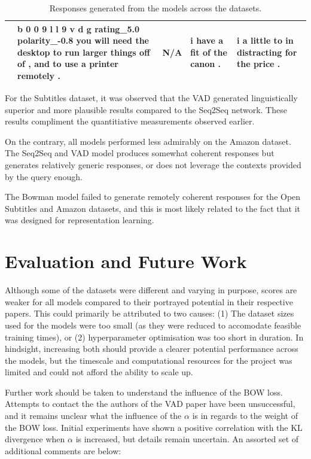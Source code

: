 \documentclass[12pt,twoside]{report}
\begin{document}
\begin{table}[!ht]
\begin{tabular}{|p{1.5cm}|p{2.8cm}|p{2.8cm}|p{2.8cm}|p{2.8cm}|}
													 & b 0 0 9 l l 9 v d g rating\_5.0 polarity\_-0.8 you will need the desktop to run larger things off of , and to use a printer remotely . & N/A                                                       & i have a fit of the canon .                                        & i a little to in distracting for the price .                               \\ \hline
	\end{tabular}
	\caption{Responses generated from the models across the datasets.}
	\label{qualitative_table}
\end{table}

For the Subtitles dataset, it was observed that the VAD generated linguistically superior and more plausible results compared to the Seq2Seq network. These results compliment the quantitiative measurements observed earlier.

On the contrary, all models performed less admirably on the Amazon dataset. The Seq2Seq and VAD model produces somewhat coherent responses but generates relatively generic responses, or does not leverage the contexts provided by the query enough.

The Bowman model failed to generate remotely coherent responses for the Open Subtitles and Amazon datasets, and this is most likely related to the fact that it was designed for representation learning.

\chapter{Evaluation and Future Work}

Although some of the datasets were different and varying in purpose, scores are weaker for all models compared to their portrayed potential in their respective papers. This could primarily be attributed to two causes: (1) The dataset sizes used for the models were too small (as they were reduced to accomodate feasible training times), or (2) hyperparameter optimisation was too short in duration. In hindsight, increasing both should provide a clearer potential performance across the models, but the timescale and computational resources for the project was limited and could not afford the ability to scale up.

Further work should be taken to understand the influence of the BOW loss. Attempts to contact the the authors of the VAD paper have been unsuccessful, and it remains unclear what the influence of the $\alpha$ is in regards to the weight of the BOW loss. Initial experiments have shown a positive correlation with the KL divergence when $\alpha$ is increased, but details remain uncertain. An assorted set of additional comments are below:
\end{document}
